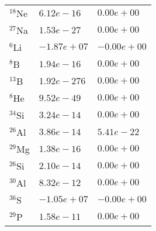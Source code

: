 \begin{tabular}{lll}
 $^{18}$Ne & $6.12e-16 $                                                        & $0.00e+00 $                                                                     \\
 $^{27}$Na & $1.53e-27 $                                                        & $0.00e+00 $                                                                     \\
 $^{6}$Li  & $-1.87e+07 $                                                       & $-0.00e+00 $                                                                    \\
 $^{8}$B   & $1.94e-16 $                                                        & $0.00e+00 $                                                                     \\
 $^{13}$B  & $1.92e-276 $                                                       & $0.00e+00 $                                                                     \\
 $^{8}$He  & $9.52e-49 $                                                        & $0.00e+00 $                                                                     \\
 $^{34}$Si & $3.24e-14 $                                                        & $0.00e+00 $                                                                     \\
 $^{26}$Al & $3.86e-14 $                                                        & $5.41e-22 $                                                                     \\
 $^{29}$Mg & $1.38e-16 $                                                        & $0.00e+00 $                                                                     \\
 $^{26}$Si & $2.10e-14 $                                                        & $0.00e+00 $                                                                     \\
 $^{30}$Al & $8.32e-12 $                                                        & $0.00e+00 $                                                                     \\
 $^{36}$S  & $-1.05e+07 $                                                       & $-0.00e+00 $                                                                    \\
 $^{29}$P  & $1.58e-11 $                                                        & $0.00e+00 $                                                                     \\

\end{tabular}

